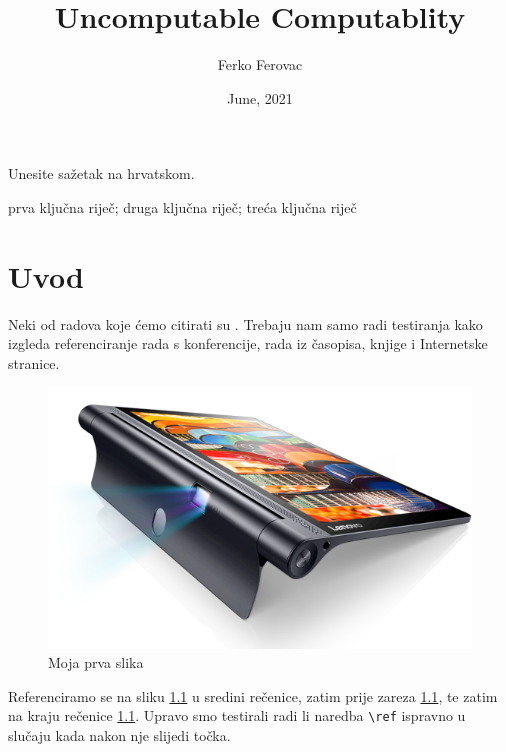\documentclass[seminarskirad]{fer}
\title{Uncomputable Computablity}
\author{Ferko Ferovac}
\date{June, 2021}
\begin{document}
\maketitle


\mainmatter



\begin{sazetak}
  Unesite sažetak na hrvatskom.

  \blindtext
\end{sazetak}

\begin{kljucnerijeci}
  prva ključna riječ; druga ključna riječ; treća ključna riječ
\end{kljucnerijeci}


\tableofcontents


\chapter{Uvod}
\label{pog:uvod}

Neki od radova koje ćemo citirati su \cite{6248073,6247753,ghiglia_pritt_phase_unwrapping,hartley2003multiple,4250461,123DCatch}.
Trebaju nam samo radi testiranja kako izgleda referenciranje rada s konferencije, rada iz časopisa, knjige i Internetske stranice.

\begin{figure}[htb]
  \centering
  \includegraphics[width=0.38\linewidth]{Figures/lenovo_yoga_tab3_pro_front.png} 
  \caption{Moja prva slika}
  \label{slk:prvaslika}
\end{figure}

Referenciramo se na sliku \ref{slk:prvaslika} u sredini rečenice, zatim prije zareza \ref{slk:prvaslika}, te zatim na kraju rečenice \ref{slk:prvaslika}.
Upravo smo testirali radi li naredba \verb|\ref| ispravno u slučaju kada nakon nje slijedi točka.
\end{document}
